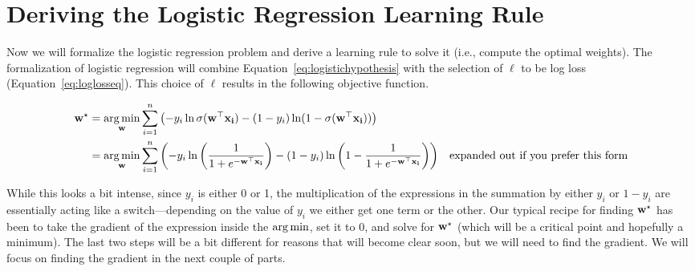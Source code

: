 \documentclass[assignment04_Solutions]{subfiles}
\begin{document}

\section{Deriving the Logistic Regression Learning Rule}


Now we will formalize the logistic regression problem and derive a learning rule to solve it (i.e., compute the optimal weights). The formalization of logistic regression will combine Equation~\ref{eq:logistichypothesis} with the selection of $\ell$ to be log loss (Equation~\ref{eq:loglosseq}).  This choice of $\ell$ results in the following objective function.

\begin{align}
\mathbf{w}^\star &= \operatorname*{arg\,min}_{\mathbf{w}} \sum_{i=1}^n \left ( - y_i \ln \sigma(\mathbf{w}^\top \mathbf{x_i}) - (1-y_i) \ln (1 - \sigma(\mathbf{w}^\top \mathbf{x_i}) ) \right) \\
&= \operatorname*{arg\,min}_{\mathbf{w}} \sum_{i=1}^n \left (  - y_i \ln \left ( \frac{1}{1+e^{-\mathbf{w}^\top \mathbf{x_i}}} \right) - (1-y_i) \ln  \left (1 - \frac{1}{1+e^{-\mathbf{w}^\top \mathbf{x_i}}} \right ) \right) &\mbox{expanded out if you prefer this form} \label{eq:objective}
\end{align}

While this looks a bit intense, since $y_i$ is either 0 or 1, the multiplication of the expressions in the summation by either $y_i$ or $1-y_i$ are essentially acting like a switch---depending on the value of $y_i$ we either get one term or the other.  Our typical recipe for finding $\mathbf{w}^\star$ has been to take the gradient of the expression inside the $\operatorname*{arg\,min}$, set it to $0$, and solve for $\mathbf{w}^\star$ (which will be a critical point and hopefully a minimum).  The last two steps will be a bit different for reasons that will become clear soon, but we will need to find the gradient.  We will focus on finding the gradient in the next couple of parts.
\end{document}

